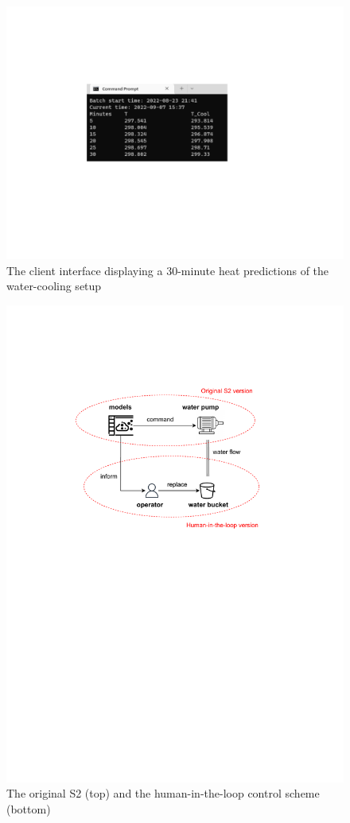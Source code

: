 \begin{figure}[hbt!]
  \centering
  \includegraphics[scale=0.5]{figures/hmi_client.pdf}
  \caption [The client interface]{The client interface displaying a 30-minute heat predictions of the water-cooling setup}
  \label{fig:hmi_client}
\end{figure}

\begin{figure}[hbt!]
  \centering
  \includegraphics[scale=0.6]{figures/hmi_scheme.pdf}
  \caption {The original S2 (top) and the human-in-the-loop control scheme (bottom)}
  \label{fig:hmi_scheme}
\end{figure}

